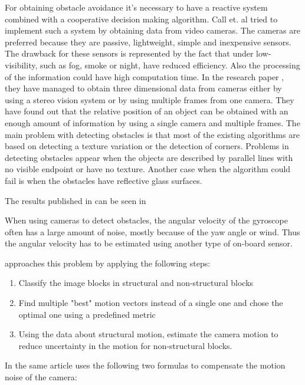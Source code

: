 For obtaining obstacle avoidance it's necessary to have a reactive system combined
with a cooperative decision making algorithm. Call et. al tried to implement
such a system by obtaining data from video cameras. The cameras are preferred
because they are passive, lightweight, simple and inexpensive sensors. The
drawback for these sensors is represented by the fact that under low-visibility, 
such as fog, smoke or night, have reduced efficiency. Also the processing of the
information could have high computation time. In the research paper \cite{tracking}, 
they have managed to obtain three dimensional data from cameras either by using
a stereo vision system or by using multiple frames from one camera. They have
found out that the relative position of an object can be obtained with an
enough amount of information by using a single camera and multiple frames. The 
main problem with detecting obstacles is that most of the existing algorithms 
are based on detecting a texture variation or the detection of corners. Problems
in detecting obstacles appear when the objects are described by parallel lines 
with no visible endpoint or have no texture. Another case when the algorithm could
fail is when the obstacles have reflective glass surfaces.

The results published in \cite{tracking} can be seen in 

\newpage

When using cameras to detect obstacles, the angular velocity of the gyroscope often
has a large amount of noise, mostly because of the yaw angle or wind. Thus
the angular velocity has to be estimated using another type of on-board sensor. 

\cite{vision-based} approaches this problem by applying the following steps:
\begin{enumerate}
\item Classify the image blocks in structural and non-structural blocks
\item Find multiple "best" motion vectors instead of a single one and chose the
optimal one using a predefined metric
\item Using the data about structural motion, estimate the camera motion to reduce
uncertainty in the motion for non-structural blocks.
\end{enumerate}

In the same article \cite{vision-based} uses the following two formulas to
compensate the motion noise of the camera:


